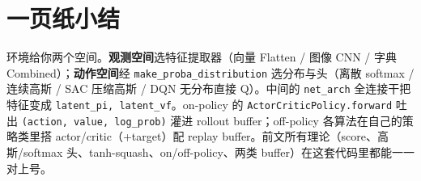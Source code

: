 \documentclass[11pt,a4paper]{article}
\begin{document}
\section{一页纸小结}

\begin{keybox}[把整条链记住]
环境给你两个空间。\textbf{观测空间}选特征提取器（向量 Flatten / 图像 CNN / 字典 Combined）；\textbf{动作空间}经 \texttt{make\_proba\_distribution} 选分布与头（离散 softmax / 连续高斯 / SAC 压缩高斯 / DQN 无分布直接 Q）。中间的 \texttt{net\_arch} 全连接干把特征变成 \texttt{latent\_pi, latent\_vf}。on-policy 的 \texttt{ActorCriticPolicy.forward} 吐出 \texttt{(action, value, log\_prob)} 灌进 rollout buffer；off-policy 各算法在自己的策略类里搭 actor/critic（+target）配 replay buffer。前文所有理论（score、高斯/softmax 头、tanh-squash、on/off-policy、两类 buffer）在这套代码里都能一一对上号。
\end{keybox}
\end{document}
